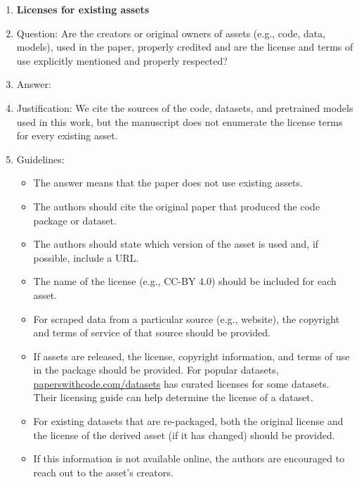 \documentclass{article}
\theoremstyle{plain}
\theoremstyle{definition}
\theoremstyle{remark}
\begin{document}
\begin{enumerate}
\item {\bf Licenses for existing assets}
    \item[] Question: Are the creators or original owners of assets (e.g., code, data, models), used in the paper, properly credited and are the license and terms of use explicitly mentioned and properly respected?
    \item[] Answer: \answerNo{} %
    \item[] Justification: We cite the sources of the code, datasets, and pretrained models used in this work, but the manuscript does not enumerate the license terms for every existing asset.
    \item[] Guidelines:
    \begin{itemize}
        \item The answer \answerNA{} means that the paper does not use existing assets.
        \item The authors should cite the original paper that produced the code package or dataset.
        \item The authors should state which version of the asset is used and, if possible, include a URL.
        \item The name of the license (e.g., CC-BY 4.0) should be included for each asset.
        \item For scraped data from a particular source (e.g., website), the copyright and terms of service of that source should be provided.
        \item If assets are released, the license, copyright information, and terms of use in the package should be provided. For popular datasets, \url{paperswithcode.com/datasets} has curated licenses for some datasets. Their licensing guide can help determine the license of a dataset.
        \item For existing datasets that are re-packaged, both the original license and the license of the derived asset (if it has changed) should be provided.
        \item If this information is not available online, the authors are encouraged to reach out to the asset's creators.
    \end{itemize}


\end{enumerate}
\end{document}
